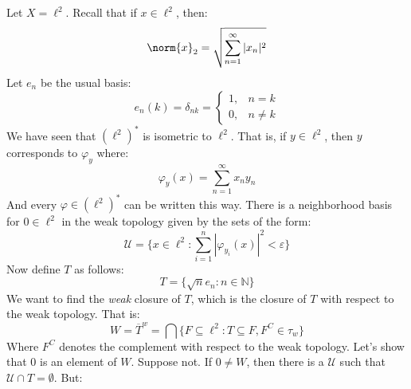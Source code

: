         \begin{lexample}
            Let $X=\ell^{2}$. Recall that if $x\in\ell^{2}$, then:
            \begin{equation}
                \norm{x}_{2}=
                    \sqrt{\sum_{n=1}^{\infty}|x_{n}|^{2}}
            \end{equation}
            Let $e_{n}$ be the usual basis:
            \begin{equation}
                e_{n}(k)=\delta_{nk}=
                    \begin{cases}
                        1,&n=k\\
                        0,&n\ne{k}
                    \end{cases}
            \end{equation}
            We have seen that $(\ell^{2})^{*}$ is isometric to
            $\ell^{2}$. That is, if $y\in\ell^{2}$, then
            $y$ corresponds to $\varphi_{y}$ where:
            \begin{equation}
                \varphi_{y}(x)=\sum_{n=1}^{\infty}
                    x_{n}y_{n}
            \end{equation}
            And every $\varphi\in(\ell^{2})^{*}$ can be written
            this way. There is a neighborhood basis for
            $0\in\ell^{2}$ in the weak topology given by the
            sets of the form:
            \begin{equation}
                \mathcal{U}=\{x\in\ell^{2}:
                    \sum_{i=1}^{n}|\varphi_{y_{i}}(x)|^{2}
                    <\varepsilon\}
            \end{equation}
            Now define $T$ as follows:
            \begin{equation}
                T=\{\sqrt{n}e_{n}:n\in\mathbb{N}\}
            \end{equation}
            We want to find the \textit{weak} closure of $T$, which
            is the closure of $T$ with respect to the weak topology.
            That is:
            \begin{equation}
                W=\overline{T}^{w}=
                \bigcap\{F\subseteq\ell^{2}:
                    T\subseteq{F},F^{C}\in\tau_{w}\}
            \end{equation}
            Where $F^{C}$ denotes the complement with respect
            to the weak topology. Let's show that $0$ is an
            element of $W$. Suppose not. If $0\ne{W}$, then
            there is a $\mathcal{U}$ such that
            $\mathcal{U}\cap{T}=\emptyset$. But:

\end{lexample}
